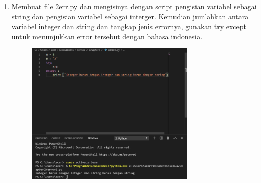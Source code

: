 \documentclass{article}
\begin{document}
\begin{enumerate}
\begin{enumerate}
\item
Membuat file 2err.py dan mengisinya dengan script pengisian variabel sebagai string dan pengisian variabel sebagai interger. 
Kemudian jumlahkan antara variabel integer dan string dan tangkap jenis errornya, gunakan try except untuk menunjukkan error tersebut dengan
bahasa indonesia.
\begin{figure}[h]
\centerline{\includegraphics[width=8cm]{figure/3.PNG}}
\end{figure}

\end{enumerate}





\end{enumerate}
\end{document}
